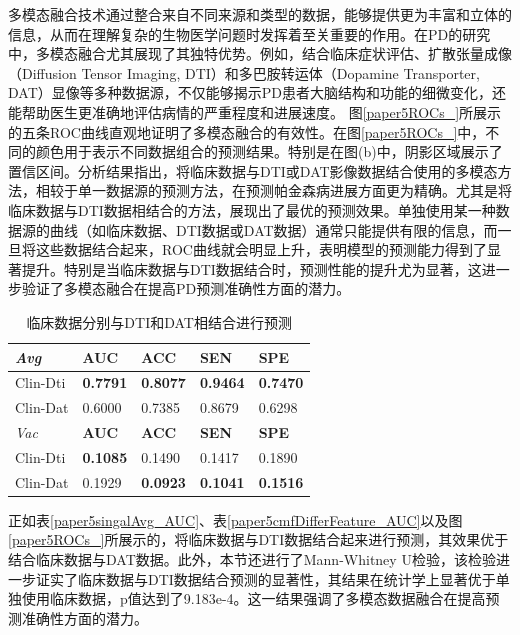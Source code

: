 多模态融合技术通过整合来自不同来源和类型的数据，能够提供更为丰富和立体的信息，从而在理解复杂的生物医学问题时发挥着至关重要的作用。在PD的研究中，多模态融合尤其展现了其独特优势。例如，结合临床症状评估、扩散张量成像（Diffusion Tensor Imaging, DTI）和多巴胺转运体（Dopamine Transporter, DAT）显像等多种数据源，不仅能够揭示PD患者大脑结构和功能的细微变化，还能帮助医生更准确地评估病情的严重程度和进展速度。
图\ref{paper5ROCs_}所展示的五条ROC曲线直观地证明了多模态融合的有效性。在图\ref{paper5ROCs_}中，不同的颜色用于表示不同数据组合的预测结果。特别是在图(b)中，阴影区域展示了置信区间。分析结果指出，将临床数据与DTI或DAT影像数据结合使用的多模态方法，相较于单一数据源的预测方法，在预测帕金森病进展方面更为精确。尤其是将临床数据与DTI数据相结合的方法，展现出了最优的预测效果。单独使用某一种数据源的曲线（如临床数据、DTI数据或DAT数据）通常只能提供有限的信息，而一旦将这些数据结合起来，ROC曲线就会明显上升，表明模型的预测能力得到了显著提升。特别是当临床数据与DTI数据结合时，预测性能的提升尤为显著，这进一步验证了多模态融合在提高PD预测准确性方面的潜力。

\begin{table}[ht]
\centering
\caption{临床数据分别与DTI和DAT相结合进行预测}
\label{paper5twoClinDtiDat}
\begin{tabular}{p{2.3cm}<{\centering}p{2.2cm}<{\centering}p{2.2cm}<{\centering}p{2.2cm}<{\centering}p{2.2cm}<{\centering}}
\hline
\textit{Avg} & \textbf{AUC} & \textbf{ACC} & \textbf{SEN} & \textbf{SPE} \\ \hline
Clin-Dti           & \textbf{0.7791}       & \textbf{0.8077}       & \textbf{0.9464}       & \textbf{0.7470}       \\
Clin-Dat           & 0.6000       & 0.7385       & 0.8679       & 0.6298     \\ \hline
\textit{Vac} & \textbf{AUC} & \textbf{ACC} & \textbf{SEN} & \textbf{SPE} \\ \hline
Clin-Dti             &\textbf{0.1085}   & 0.1490       & 0.1417       & 0.1890       \\
Clin-Dat           & 0.1929    & \textbf{0.0923}      & \textbf{0.1041}       & \textbf{0.1516}     \\ \hline
\end{tabular}
\end{table}

正如表\ref{paper5singalAvg_AUC}、表\ref{paper5cmfDifferFeature_AUC}以及图\ref{paper5ROCs_}所展示的，将临床数据与DTI数据结合起来进行预测，其效果优于结合临床数据与DAT数据。此外，本节还进行了Mann-Whitney U检验，该检验进一步证实了临床数据与DTI数据结合预测的显著性，其结果在统计学上显著优于单独使用临床数据，p值达到了9.183e-4。这一结果强调了多模态数据融合在提高预测准确性方面的潜力。


